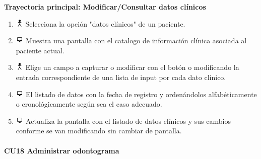\textbf{Trayectoria principal: Modificar/Consultar datos clínicos}        
\begin{enumerate}
\item \includegraphics[height=1em]{pictures/actor.png} Selecciona la opción "datos clínicos" de un paciente.
\item \includegraphics[height=1em]{pictures/sistema.png} Muestra una pantalla con el catalogo de información clínica asociada al paciente actual.
\item \includegraphics[height=1em]{pictures/actor.png} Elige un campo a capturar o modificar con el botón o modificando la entrada correspondiente de una lista de input por cada dato clínico.
\item \includegraphics[height=1em]{pictures/sistema.png} El listado de datos con la fecha de registro y ordenándolos alfabéticamente o cronológicamente según sea el caso adecuado.
\item \includegraphics[height=1em]{pictures/sistema.png} Actualiza la pantalla con el listado de datos clínicos y sus cambios conforme se van modificando sin cambiar de pantalla.
\end{enumerate} \bigskip


\paragraph{CU18 Administrar odontograma}

